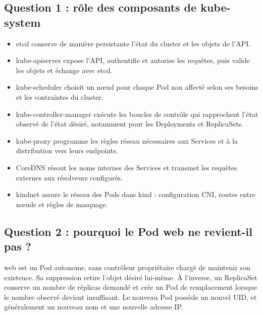 \documentclass[11pt,a4paper]{article}
\begin{document}
\par\noindent\begin{minipage}{\linewidth}
\subsection*{Question 1 : rôle des composants de kube-system}

\begin{itemize}
\item etcd conserve de manière persistante l'état du cluster et les objets de l'API.
\item kube-apiserver expose l'API, authentifie et autorise les requêtes, puis valide les objets et échange avec etcd.
\item kube-scheduler choisit un nœud pour chaque Pod non affecté selon ses besoins et les contraintes du cluster.
\item kube-controller-manager exécute les boucles de contrôle qui rapprochent l'état observé de l'état désiré, notamment pour les Deployments et ReplicaSets.
\item kube-proxy programme les règles réseau nécessaires aux Services et à la distribution vers leurs endpoints.
\item CoreDNS résout les noms internes des Services et transmet les requêtes externes aux résolveurs configurés.
\item kindnet assure le réseau des Pods dans kind : configuration CNI, routes entre nœuds et règles de masquage.
\end{itemize}

\end{minipage}\par\vspace{7pt}
\par\noindent\begin{minipage}{\linewidth}
\subsection*{Question 2 : pourquoi le Pod web ne revient-il pas ?}

web est un Pod autonome, sans contrôleur propriétaire chargé de maintenir son existence.
Sa suppression retire l'objet désiré lui-même. À l'inverse, un ReplicaSet conserve un nombre
de réplicas demandé et crée un Pod de remplacement lorsque le nombre observé devient insuffisant.
Le nouveau Pod possède un nouvel UID, et généralement un nouveau nom et une nouvelle adresse IP.

\end{minipage}\par\vspace{7pt}
\end{document}
